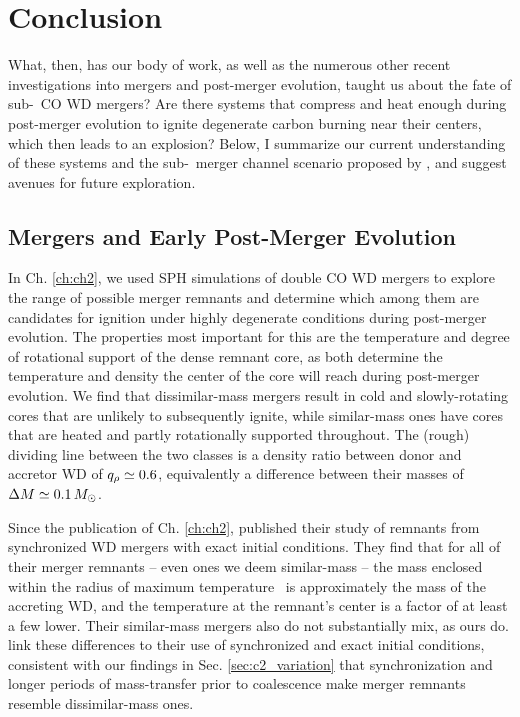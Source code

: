 \chapter{Conclusion}

What, then, has our body of work, as well as the numerous other recent investigations into mergers and post-merger evolution, taught us about the fate of sub-\Mch\ CO WD mergers?  Are there systems that compress and heat enough during post-merger evolution to ignite degenerate carbon burning near their centers, which then leads to an explosion?  Below, I summarize our current understanding of these systems and the sub-\Mch\ merger channel scenario proposed by \citeal{vkercj10}, and suggest avenues for future exploration.

\section{Mergers and Early Post-Merger Evolution}
\label{sec:c6_mergers_pme}

In Ch. \ref{ch:ch2}, we used SPH simulations of double CO WD mergers to explore the range of possible merger remnants and determine which among them are candidates for ignition under highly degenerate conditions during post-merger evolution.  The properties most important for this are the temperature and degree of rotational support of the dense remnant core, as both determine the temperature and density the center of the core will reach during post-merger evolution.  We find that dissimilar-mass mergers result in cold and slowly-rotating cores that are unlikely to subsequently ignite, while similar-mass ones have cores that are heated and partly rotationally supported throughout.  The (rough) dividing line between the two classes is a density ratio between donor and accretor WD of $\qrho\simeq0.6$, equivalently a difference between their masses of $\Delta M \simeq 0.1\,\Msun$.

Since the publication of Ch. \ref{ch:ch2}, \cite{dan+14} published their study of remnants from synchronized WD mergers with exact initial conditions.  They find that for all of their merger remnants -- even ones we deem similar-mass -- the mass enclosed within the radius of maximum temperature \MencTmax\ is approximately the mass of the accreting WD, and the temperature at the remnant's center is a factor of at least a few lower.  Their similar-mass mergers also do not substantially mix, as ours do.  \cite{dan+14} link these differences to their use of synchronized and exact initial conditions, consistent with our findings in Sec. \ref{sec:c2_variation} that synchronization and longer periods of mass-transfer prior to coalescence make merger remnants resemble dissimilar-mass ones.

